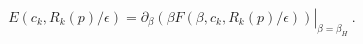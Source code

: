 \begin{equation}\label{3.8}
E(c_k,R_k(p)/\epsilon)=\left.\partial_\beta
(\beta
F(\beta,c_k,R_k(p)/\epsilon))\right|_{\beta=\beta_H}~.
\end{equation}

